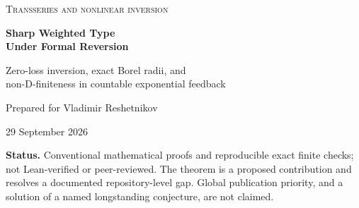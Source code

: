 \documentclass[11pt,a4paper]{article}
\numberwithin{equation}{section}
\theoremstyle{definition}
\theoremstyle{remark}
\newcommand{\ee}{\mathrm e}
\begin{document}
\hypersetup{pageanchor=false}
\begin{titlepage}
\centering
\vspace*{13mm}
{\Large\scshape Transseries and nonlinear inversion\par}
\vspace{12mm}
{\Huge\bfseries Sharp Weighted Type\\[3mm] Under Formal Reversion\par}
\vspace{9mm}
{\Large Zero-loss inversion, exact Borel radii, and\\[2mm]
non-D-finiteness in countable exponential feedback\par}
\vspace{12mm}
{\large Prepared for Vladimir Reshetnikov\par}
\vspace{3mm}
29 September 2026
\vspace{13mm}
\begin{minipage}{0.9\textwidth}
\begin{abstract}
Let $M_0=1$ and let $(M_n)$ be a positive log-convex sequence. We prove
that the weighted coefficient type
\[
 \tau_M(f)=\limsup_{n\to\infty}
       \left(\frac{|[z^n]f|}{M_n}\right)^{1/n}
\]
is preserved by every tangent-to-identity formal compositional inverse
if and only if $M_n^{1/n}\to\infty$. A finite Lagrange majorant gives an
explicit overhead $\exp\{O(n/\sqrt{M_n^{1/n}})\}$, hence no loss in the
exponential constant. Analytic coordinate changes obey an exact scaling
law, without a moderate-growth assumption on the weight.

Using two explicitly stated forward estimates from ProveIt's
countable exponential-feedback report, we obtain the missing sharp type
of its inverse, exact inverse Borel radii, and a logarithmically refined
inverse type. For $\lambda_j=j^2$, this yields
\[
 \limsup_{n\to\infty}
 \left(\frac{|[u^n]\widehat Q(u)|\,\log(n+\ee)^{2n}}{n!}\right)^{1/n}=4.
\]
Its ordinary Borel transform is entire but has infinite classical order,
with an exact iterated-logarithmic maximum-modulus limsup. An elementary
holonomic obstruction proves that both the forward series and its inverse
are non-D-finite. All new arguments are proved in the article; the two
repository inputs, finite computational checks, and remaining research
questions are distinguished explicitly.
\end{abstract}
\end{minipage}
\vfill
\begin{minipage}{0.9\textwidth}\small
\textbf{Status.} Conventional mathematical proofs and reproducible exact
finite checks; not Lean-verified or peer-reviewed. The theorem is a proposed
contribution and resolves a documented repository-level gap. Global
publication priority, and a solution of a named longstanding conjecture,
are not claimed.
\end{minipage}
\end{titlepage}
\end{document}
